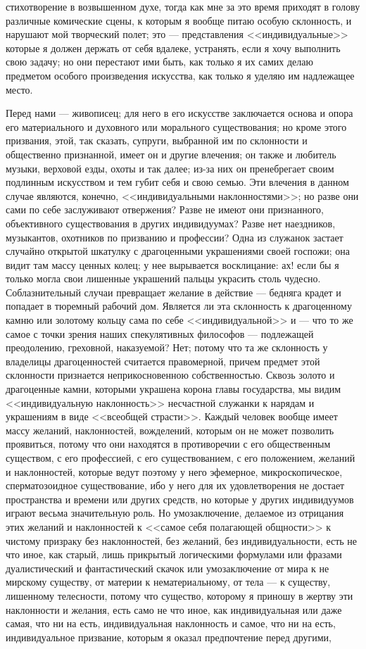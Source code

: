 \documentclass[12pt]{article}
\begin{document}
стихотворение в возвышенном духе, тогда как мне за это время приходят в голову различные комические сцены, к которым я вообще питаю особую склонность, и нарушают мой творческий полет; это --- представления <<индивидуальные>>  которые я должен держать от себя вдалеке, устранять, если я хочу выполнить свою задачу; но они перестают ими быть, как только я их самих делаю предметом особого произведения искусства, как только я уделяю им надлежащее место. 

Перед нами --- живописец; для него в его искусстве заключается основа и опора его материального и духовного или морального существования; но кроме этого призвания, этой, так сказать, супруги, выбранной им по склонности и общественно признанной, имеет он и другие влечения; он также и любитель музыки, верховой езды, охоты и так далее; из-за них он пренебрегает своим подлинным искусством и тем губит себя и свою семью. Эти влечения в данном случае являются, конечно, <<индивидуальными наклонностями>>; но разве они сами по себе заслуживают отвержения? Разве не имеют они признанного, объективного существования в других индивидуумах? Разве нет наездников, музыкантов, охотников по призванию и профессии? Одна из служанок застает случайно открытой шкатулку с драгоценными украшениями своей госпожи; она видит там массу ценных колец; у нее вырывается восклицание: ах! если бы я только могла свои лишенные украшений пальцы украсить столь чудесно. Соблазнительный случаи превращает желание в действие --- бедняга крадет и попадает в тюремный рабочий дом. Является ли эта склонность к драгоценному камню или золотому кольцу сама по себе <<индивидуальной>> и --- что то же самое с точки зрения наших спекулятивных философов --- подлежащей преодолению, греховной, наказуемой? Нет; потому что та же склонность у владелицы драгоценностей считается правомерной, причем предмет этой склонности признается неприкосновенною собственностью. Сквозь золото и драгоценные камни, которыми украшена корона главы государства, мы видим <<индивидуальную наклонность>> несчастной служанки к нарядам и украшениям в виде <<всеобщей страсти>>. Каждый человек вообще имеет массу желаний, наклонностей, вожделений, которым он не может позволить проявиться, потому что они находятся в противоречии с его общественным существом, с его профессией, с его существованием, с его положением, желаний и наклонностей, которые ведут поэтому у него эфемерное, микроскопическое, сперматозоидное существование, ибо у него для их удовлетворения не достает пространства и времени или других средств, но которые у других индивидуумов играют весьма значительную роль. Но умозаключение, делаемое из отрицания этих желаний и наклонностей к <<самое себя полагающей общности>>  к чистому призраку без наклонностей, без желаний, без индивидуальности, есть не что иное, как старый, лишь прикрытый логическими формулами или фразами дуалистический и фантастический скачок или умозаключение от мира к не мирскому существу, от материи к нематериальному, от тела --- к существу, лишенному телесности, потому что существо, которому я приношу в жертву эти наклонности и желания, есть само не что иное, как индивидуальная или даже самая, что ни на есть, индивидуальная наклонность и самое, что ни на есть, индивидуальное призвание, которым я оказал предпочтение перед другими, 
\end{document}
